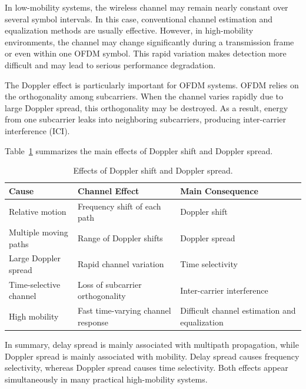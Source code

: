 In low-mobility systems, the wireless channel may remain nearly constant over several symbol intervals. In this case, conventional channel estimation and equalization methods are usually effective. However, in high-mobility environments, the channel may change significantly during a transmission frame or even within one OFDM symbol. This rapid variation makes detection more difficult and may lead to serious performance degradation.

The Doppler effect is particularly important for OFDM systems. OFDM relies on the orthogonality among subcarriers. When the channel varies rapidly due to large Doppler spread, this orthogonality may be destroyed. As a result, energy from one subcarrier leaks into neighboring subcarriers, producing inter-carrier interference (ICI).

Table~\ref{tab:doppler_effects} summarizes the main effects of Doppler shift and Doppler spread.

\begin{table}[H]
\centering
\caption{Effects of Doppler shift and Doppler spread.}
\label{tab:doppler_effects}

\begin{tabular}{|p{4cm}|p{4cm}|p{5cm}|}
\hline
\textbf{Cause} &
\textbf{Channel Effect} &
\textbf{Main Consequence} \\
\hline

Relative motion &
Frequency shift of each path &
Doppler shift \\
\hline

Multiple moving paths &
Range of Doppler shifts &
Doppler spread \\
\hline

Large Doppler spread &
Rapid channel variation &
Time selectivity \\
\hline

Time-selective channel &
Loss of subcarrier orthogonality &
Inter-carrier interference \\
\hline

High mobility &
Fast time-varying channel response &
Difficult channel estimation and equalization \\
\hline

\end{tabular}

\end{table}

In summary, delay spread is mainly associated with multipath propagation, while Doppler spread is mainly associated with mobility. Delay spread causes frequency selectivity, whereas Doppler spread causes time selectivity. Both effects appear simultaneously in many practical high-mobility systems.

